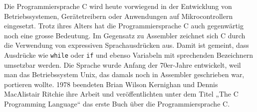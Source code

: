 \par
Die Programmiersprache C wird heute vorwiegend in der Entwicklung von Betriebssystemen, Gerätetreibern oder Anwendungen auf Mikrocontrollern eingesetzt. Trotz ihres Alters hat die Programmiersprache C auch gegenwärtig noch eine grosse Bedeutung. Im Gegensatz zu Assembler zeichnet sich C durch die Verwendung von expressiven Sprachausdrücken aus. Damit ist gemeint, dass Ausdrücke wie \texttt{while} oder \texttt{if} und ebenso Variabeln mit sprechenden Bezeichnern umsetzbar werden. Die Sprache wurde Anfang der 70er-Jahre entwickelt, weil man das Betriebssystem Unix, das damals noch in Assembler geschrieben war, portieren wollte. 1978 beendeten Brian Wilson Kernighan und Dennis MacAlistair Ritchie ihre Arbeit und veröffentlichten unter dem Titel „The C Programming Language“ das erste Buch über die Programmiersprache C.



